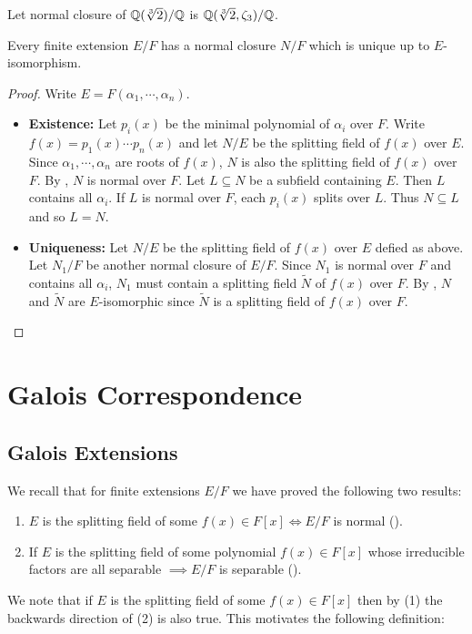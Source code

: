 \documentclass[11pt]{article}
\begin{document}
\begin{example}
    Let normal closure of $\mathbb{Q}(\sqrt[3]{2})/\mathbb{Q}$ is $\mathbb{Q}(\sqrt[3]{2},\zeta_3)/\mathbb{Q}$.
\end{example}

\begin{theorem}
    Every finite extension $E/F$ has a normal closure $N/F$ which is unique up to $E$-isomorphism.
\end{theorem}

\begin{proof}
    Write $E=F(\alpha_1,\cdots,\alpha_n)$.
    \begin{itemize}
        \item\textbf{Existence:} Let $p_i(x)$ be the minimal polynomial of $\alpha_i$ over $F$. Write $f(x)=p_1(x)\cdots p_n(x)$ and let $N/E$ be the splitting field of $f(x)$ over $E$. Since $\alpha_1,\cdots,\alpha_n$ are roots of $f(x)$, $N$ is also the splitting field of $f(x)$ over $F$. By , $N$ is normal over $F$. Let $L\subseteq N$ be a subfield containing $E$. Then $L$ contains all $\alpha_i$. If $L$ is normal over $F$, each $p_i(x)$ splits over $L$. Thus $N\subseteq L$ and so $L=N$.

        \item\textbf{Uniqueness:} Let $N/E$ be the splitting field of $f(x)$ over $E$ defied as above. Let $N_1/F$ be another normal closure of $E/F$. Since $N_1$ is normal over $F$ and contains all $\alpha_i$, $N_1$ must contain a splitting field $\tilde{N}$ of $f(x)$ over $F$. By , $N$ and $\tilde{N}$ are $E$-isomorphic since $\tilde{N}$ is a splitting field of $f(x)$ over $F$.
    \end{itemize}
\end{proof}

\pagebreak
\section{Galois Correspondence}

\subsection{Galois Extensions}

We recall that for finite extensions $E/F$ we have proved the following two results:
\begin{enumerate}
    \item $E$ is the splitting field of some $f(x)\in F[x]\iff E/F$ is normal ().
    \item If $E$ is the splitting field of some polynomial $f(x)\in F[x]$ whose irreducible factors are all separable $\implies E/F$ is separable ().
\end{enumerate}
We note that if $E$ is the splitting field of some $f(x)\in F[x]$ then by (1) the backwards direction of (2) is also true. This motivates the following definition:
\end{document}
